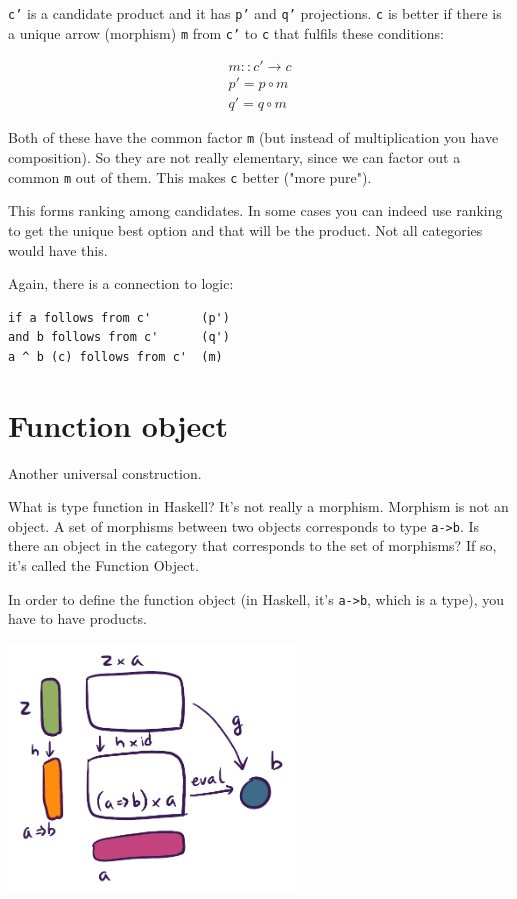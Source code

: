 \documentclass[11pt]{article}
\begin{document}
\texttt{c'} is a candidate product and it has \texttt{p'} and \texttt{q'} projections. \texttt{c} is better if there is a unique arrow (morphism) \texttt{m} from \texttt{c'} to \texttt{c} that fulfils these conditions:

\begin{equation}
\begin{aligned}
m :: c' \rightarrow c \\
p' = p \circ m \\
q' = q \circ m
\end{aligned}
\end{equation}


Both of these have the common factor \texttt{m} (but instead of multiplication you have composition). So they are not really elementary, since we can factor out a common \texttt{m} out of them. This makes \texttt{c} better ("more pure").

This forms ranking among candidates. In some cases you can indeed use ranking to get the unique best option and that will be the product. Not all categories would have this.

Again, there is a connection to logic:

\begin{verbatim}
if a follows from c'       (p')
and b follows from c'      (q')
a ^ b (c) follows from c'  (m)
\end{verbatim}

\section{Function object}
\label{sec:org3e6631f}

Another universal construction.

What is type function in Haskell? It's not really a morphism. Morphism is not an object. A set of morphisms between two objects corresponds to type \texttt{a->b}. Is there an object in the category that corresponds to the set of morphisms? If so, it's called the Function Object.

In order to define the function object (in Haskell, it's \texttt{a->b}, which is a type), you have to have products.

\begin{center}
\includegraphics[width=3.0in]{./img/function.png}
\end{center}
\end{document}
